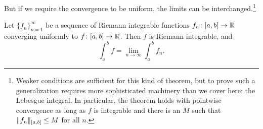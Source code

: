 But if we require the convergence to be uniform, the limits can
be interchanged.\footnote{Weaker conditions
are sufficient for this kind of theorem, but to prove such a generalization requires
more sophisticated machinery than we cover here: the Lebesgue integral.
In particular, the theorem holds with pointwise
convergence as long as $f$ is integrable and there is an $M$ such that
$\lVert {f_n} \rVert_{[a,b]} \leq M$ for all $n$.}

\begin{thm} \label{integralinterchange:thm}
Let $\{ f_n \}_{n=1}^\infty$ be a sequence of Riemann integrable
functions
$f_n \colon [a,b] \to {\mathbb{R}}$
converging uniformly to $f \colon [a,b]
\to {\mathbb{R}}$.  Then $f$ is Riemann integrable, and
\begin{equation*}
\int_a^b f = \lim_{n\to\infty} \int_a^b f_n .
\end{equation*}
\end{thm}

